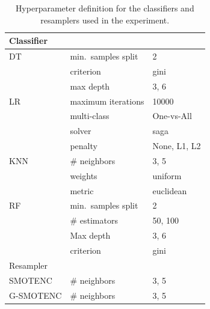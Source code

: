 \documentclass[parskip=full]{scrartcl}
\begin{document}
\begin{table}
	\centering
    \caption{\label{tbl:grid}
        Hyperparameter definition for the classifiers and resamplers used in
        the experiment.
    }
	\begin{tabular}{lll}
		\toprule
		Classifier      &                                  &                                \\
		\midrule
        DT              & min.\ samples split              & 2                              \\
                        & criterion                        & gini                           \\
                        & max depth                        & 3, 6                           \\
		LR              & maximum iterations               & 10000                          \\
                        & multi-class                      & One-vs-All                     \\
		                & solver                           & saga                           \\
                        & penalty                          & None, L1, L2                   \\
		KNN             & \# neighbors                     & 3, 5                           \\
                        & weights                          & uniform                        \\
                        & metric                           & euclidean                      \\
		RF              & min.\ samples split              & 2                              \\
		                & \# estimators                    & 50, 100                        \\
		                & Max depth                        & 3, 6                           \\
                        & criterion                        & gini                           \\
		\toprule
		Resampler       &                                  &                                \\
		\midrule
		SMOTENC         & \# neighbors                     & 3, 5                           \\
		G-SMOTENC       & \# neighbors                     & 3, 5                           \\

\end{tabular}
\end{table}
\end{document}

